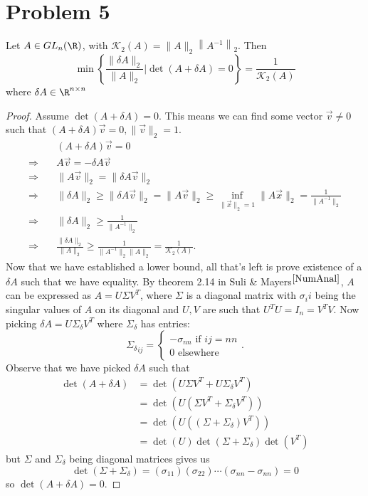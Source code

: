 \section{Problem 5}
\begin{proposition}
  Let $A\in GL_n(\R)$, with $\mathcal{K}_{2}(A)=\|A\|_{2}\left\|A^{-1}\right\|_{2}$. Then
    $$ \min \left\{\frac{\|\delta A\|_{2}}{\|A\|_{2}} | \operatorname{det}(A+\delta A)=0\right\}=\frac{1}{\mathcal{K}_{2}(A)} $$
  where $\delta A\in \R^{n\times n}$
\end{proposition}
\begin{proof}
  Assume $\operatorname{det}(A+\delta A)=0$. This means we can find some vector $\vec{v}\neq 0$ such that $(A+\delta A)\vec{v}=0, \|\vec{v}\|_2=1$.
    \begin{align*}
      & (A+\delta A)\vec{v}=0 \\
      \Rightarrow \quad & A\vec{v}=-\delta A\vec{v} \\
      \Rightarrow \quad & \|A\vec{v}\|_2 = \|\delta A\vec{v}\|_2 \\
      \Rightarrow \quad & \|\delta A\|_2 \geq \|\delta A\vec{v}\|_2 = \|A\vec{v}\|_2 \geq \inf_{\|\vec{x}\|_2=1}\|A\vec{x}\|_2 = \frac{1}{\|A^{-1}\|_2} \\
      \Rightarrow \quad & \|\delta A\|_2 \geq \frac{1}{\|A^{-1}\|_2} \\
      \Rightarrow \quad & \frac{\|\delta A\|_2}{\|A\|_2} \geq \frac{1}{\|A^{-1}\|_2\|A\|_2} = \frac{1}{\mathcal{K}_2(A)}.
    \end{align*}
  Now that we have established a lower bound, all that's left is prove existence of a $\delta A$ such that we have equality.
    \newline By theorem 2.14 in Suli \& Mayers$^{\ref{NumAnal}}$, $A$ can be expressed as $A=U\Sigma V^T$, where $\Sigma$ is a diagonal matrix with $\sigma_ii$ being the singular values of $A$ on its diagonal and $U,V$ are such that $U^TU=I_n=V^TV$. Now picking $\delta A=U\Sigma_{\delta}V^T$
    where $\Sigma_{\delta}$ has entries:
     $$ {\Sigma_{\delta}}_{ij} =
  \begin{cases}
    -\sigma_{nn} \text{ if }ij=nn \\
    0 \text{ elsewhere }
  \end{cases}
     .$$
     Observe that we have picked $\delta A$ such that
  \begin{align*}
    \operatorname{det}(A+\delta A) & = \operatorname{det}(U\Sigma V^T + U\Sigma_{\delta}V^T) \\
    & = \operatorname{det}(U(\Sigma V^T + \Sigma_{\delta}V^T)) \\
    & = \operatorname{det}(U \left((\Sigma+\Sigma_{\delta})V^T\right)) \\
    & = \operatorname{det}(U)\operatorname{det}(\Sigma+\Sigma_{\delta})\operatorname{det}(V^T)
  \end{align*}
  but $\Sigma$ and $\Sigma_{\delta}$ being diagonal matrices gives us
    $$\operatorname{det}(\Sigma+\Sigma_{\delta})=(\sigma_{11})(\sigma_{22})\cdots(\sigma_{nn}-\sigma_{nn})=0 $$
  so $\operatorname{det}(A+\delta A)=0$.
\end{proof}
